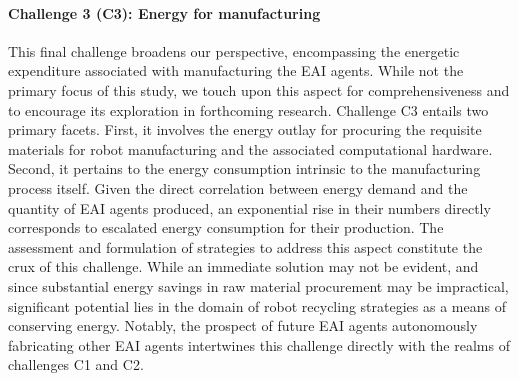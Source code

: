 \documentclass[12pt]{article}
\begin{document}
\paragraph*{\textbf{Challenge 3} (C3): Energy for manufacturing}
This final challenge broadens our perspective, encompassing the energetic expenditure associated with manufacturing the EAI agents. While not the primary focus of this study, we touch upon this aspect for comprehensiveness and to encourage its exploration in forthcoming research. Challenge C3 entails two primary facets. First, it involves the energy outlay for procuring the requisite materials for robot manufacturing and the associated computational hardware. Second, it pertains to the energy consumption intrinsic to the manufacturing process itself. Given the direct correlation between energy demand and the quantity of EAI agents produced, an exponential rise in their numbers directly corresponds to escalated energy consumption for their production. The assessment and formulation of strategies to address this aspect constitute the crux of this challenge. While an immediate solution may not be evident, and since substantial energy savings in raw material procurement may be impractical, significant potential lies in the domain of robot recycling strategies as a means of conserving energy. Notably, the prospect of future EAI agents autonomously fabricating other EAI agents intertwines this challenge directly with the realms of challenges C1 and C2.
\end{document}
